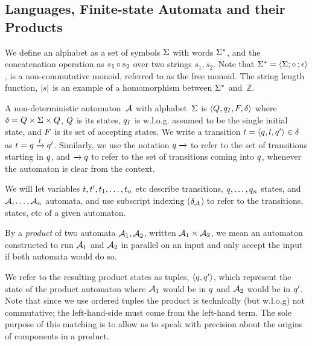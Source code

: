 \documentclass[acmsmall,review,anonymous,screen]{acmart}\settopmatter{printfolios=true,printccs=true,printacmref=true}
\theoremstyle{definition}
\begin{document}
\subsection{Languages, Finite-state Automata and their Products}

We define an alphabet as a set of symbols $\Sigma$ with words $\Sigma^*$, and
the concatenation operation as $s_1 \operatorname{\circ}{} s_2$ over two strings $s_1, s_2$.
Note that $\Sigma^* = \left\langle\Sigma;\operatorname{\circ}{};\epsilon\right\rangle$, is a
non-commutative monoid, referred to as the free monoid. The string length
function, $|s|$ is an example of a homomorphism between $\Sigma^*$
and~$\mathbb{Z}$.

A non-deterministic automaton~$\mathcal{A}$ with alphabet~$\Sigma$ is
$\left\langle Q, q_I, F, \delta\right\rangle$ where $\delta = Q \times \Sigma \times
Q$, $Q$ is its states, $q_I$ is w.l.o.g. assumed to be the
single initial state, and $F$ is its set of accepting states.  We
write a transition $t = \left\langle q, l, q'\right\rangle \in
\delta$ as $t = q \xrightarrow{l} q'$.
Similarly, we use the notation $q \xrightarrow{}$ to refer to the set of
transitions starting in $q$, and $\xrightarrow{} q$ to refer to the
set of transitions coming into $q$, whenever the automaton is clear from
the context.

We will let variables $t, t', t_1, \ldots,
t_n$ etc describe transitions, $q, \ldots, q_n$ states, and
$\mathcal{A}, \ldots, \mathcal{A}_n$ automata, and use subscript indexing
($\delta_{\mathcal{A}}$) to refer to the transitions, states, etc of a given
automaton.

By a \emph{product} of two automata $\mathcal{A}_1, \mathcal{A}_2$, written
$\mathcal{A}_1 \times \mathcal{A}_2$, we mean an automaton constructed to run
$\mathcal{A}_1$ and $\mathcal{A}_2$ in parallel on an input and only accept the
input if both automata would do so.

We refer to the resulting product states as tuples, $\left\langle q, q'\right\rangle$,
which represent the state of the product automaton where $\mathcal{A}_1$ would be
in $q$ and $\mathcal{A}_2$ would be in $q'$. Note that since we use
ordered tuples the product is technically (but w.l.o.g) not commutative; the
left-hand-side must come from the left-hand term. The sole purpose of this
matching is to allow us to speak with precision about the origins of components
in a product.
\end{document}
